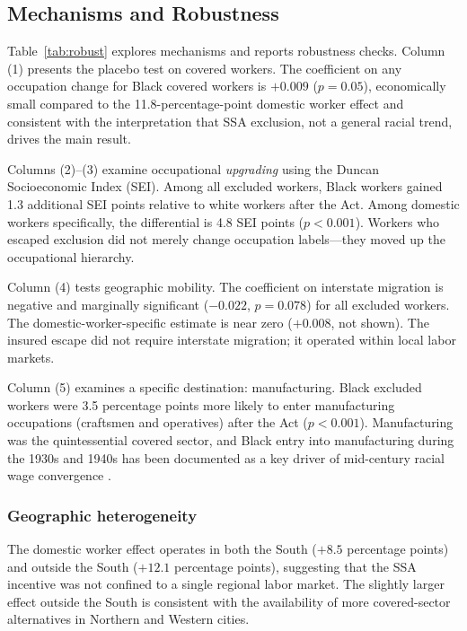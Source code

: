 \documentclass[12pt]{article}
\begin{document}
\subsection{Mechanisms and Robustness}



Table~\ref{tab:robust} explores mechanisms and reports robustness checks. Column (1) presents the placebo test on covered workers. The coefficient on any occupation change for Black covered workers is $+0.009$ ($p = 0.05$), economically small compared to the 11.8-percentage-point domestic worker effect and consistent with the interpretation that SSA exclusion, not a general racial trend, drives the main result.

Columns (2)--(3) examine occupational \textit{upgrading} using the Duncan Socioeconomic Index (SEI). Among all excluded workers, Black workers gained 1.3 additional SEI points relative to white workers after the Act. Among domestic workers specifically, the differential is 4.8 SEI points ($p < 0.001$). Workers who escaped exclusion did not merely change occupation labels---they moved up the occupational hierarchy.

Column (4) tests geographic mobility. The coefficient on interstate migration is negative and marginally significant ($-0.022$, $p = 0.078$) for all excluded workers. The domestic-worker-specific estimate is near zero ($+0.008$, not shown). The insured escape did not require interstate migration; it operated within local labor markets.

Column (5) examines a specific destination: manufacturing. Black excluded workers were 3.5 percentage points more likely to enter manufacturing occupations (craftsmen and operatives) after the Act ($p < 0.001$). Manufacturing was the quintessential covered sector, and Black entry into manufacturing during the 1930s and 1940s has been documented as a key driver of mid-century racial wage convergence \citep{smith1984, collins2000}.

\subsubsection*{Geographic heterogeneity} The domestic worker effect operates in both the South ($+8.5$ percentage points) and outside the South ($+12.1$ percentage points), suggesting that the SSA incentive was not confined to a single regional labor market. The slightly larger effect outside the South is consistent with the availability of more covered-sector alternatives in Northern and Western cities.
\end{document}
